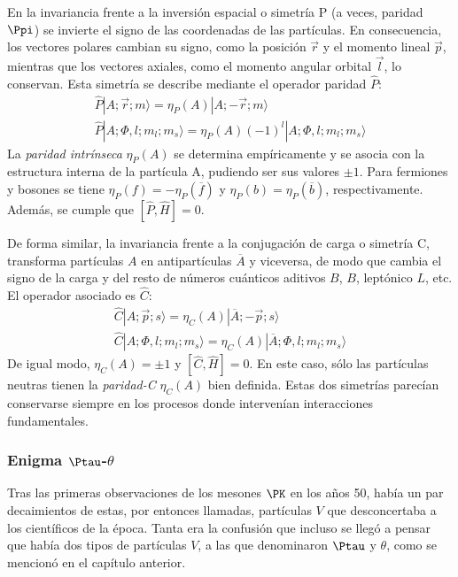 En la invariancia frente a la inversión espacial o simetría P (a veces, paridad $\Ppi$) se invierte el signo de las coordenadas de las partículas. En consecuencia, los vectores polares cambian su signo, como la posición $\vec{r}$ y el momento lineal $\vec{p}$, mientras que los vectores axiales, como el momento angular orbital $\vec{l}$, lo conservan. Esta simetría se describe mediante el operador paridad $\hat{P}$:
\begin{equation}
\begin{gathered}
\hat{P}\left| A;\vec{r};m\rangle =\eta_P\left(A\right) \right| A; -\vec{r}; m \rangle \\  \hat{P}| A; \Phi, l; m_{l}; m_{s} \rangle =\eta_P \left( A\right) \left( -1\right)^{l} | A;\Phi, l; m_{l}; m_s\rangle 
\end{gathered}
\end{equation}
La \textit{paridad intrínseca} $\eta_P(A)$ se determina empíricamente y se asocia con la estructura interna de la partícula A, pudiendo ser sus valores $\pm 1$. Para fermiones y bosones se tiene $\eta_P(f)=-\eta_P \left(\overline{f}\right)$ y $\eta_P(b)=\eta_P \left(\overline{b}\right)$, respectivamente. Además, se cumple que $[\hat{P}, \widehat{H}]=0$.


De forma similar, la invariancia frente a la conjugación de carga o simetría C, transforma partículas $A$ en antipartículas $\overline{A}$ y viceversa, de modo que cambia el signo de la carga y del resto de números cuánticos aditivos $B$, $B$, leptónico $L$, etc. El operador asociado es $\hat{C}$:
\begin{equation}
\begin{gathered}
\hat{C}\left| A;\vec{p};s\rangle =\eta_C\left(A\right) \right| \overline{A}; -\vec{p}; s \rangle \\ \hat{C}| A; \Phi, l; m_{l}; m_{s} \rangle =\eta_C \left( A\right) | \overline{A};\Phi, l; m_{l}; m_s\rangle 
\end{gathered}
\end{equation}
De igual modo, $\eta_C(A)=\pm 1$ y $[\hat{C}, \widehat{H}]=0$. En este caso, sólo las partículas neutras tienen la \textit{paridad-C} $\eta_C(A)$ bien definida.
Estas dos simetrías parecían conservarse siempre en los procesos donde intervenían interacciones fundamentales.

\subsubsection{Enigma $\Ptau$-$\theta$}
Tras las primeras observaciones de los mesones $\PK$ en los años 50, había un par decaimientos de estas, por entonces llamadas, partículas $V$ que desconcertaba a los científicos de la época. Tanta era la confusión que incluso se llegó a pensar que había dos tipos de partículas $V$, a las que denominaron $\Ptau$ y $\theta$, como se mencionó en el capítulo anterior. 

